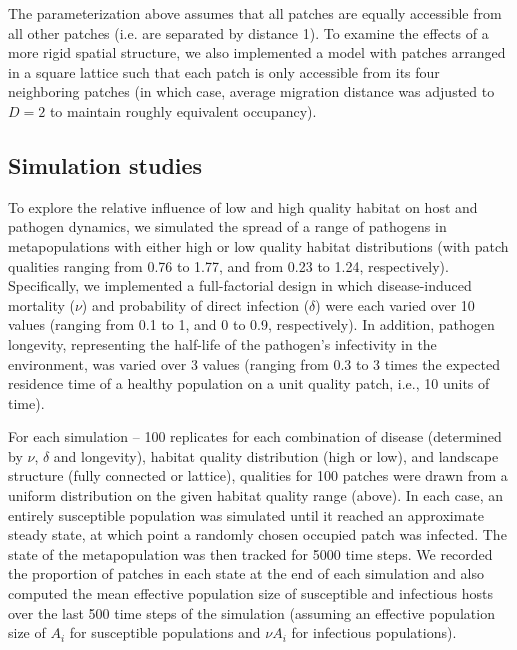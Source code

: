 \documentclass{article}
\begin{document}
The parameterization above assumes that all patches are equally accessible from all other patches (i.e. are separated by distance 1).  To examine the effects of a more rigid spatial structure, we also implemented a model with patches arranged in a square lattice such that each patch is only accessible from its four neighboring patches (in which case, average migration distance was adjusted to $D = 2$ to maintain roughly equivalent occupancy).  

\subsection{Simulation studies}

To explore the relative influence of low and high quality habitat on host and pathogen dynamics, we simulated the spread of a range of pathogens in metapopulations with either high or low quality habitat distributions (with patch qualities ranging from 0.76 to 1.77, and from 0.23 to 1.24, respectively).  Specifically, we implemented a full-factorial design in which disease-induced mortality ($\nu$) and probability of direct infection ($\delta$) were each varied over 10 values (ranging from 0.1 to 1, and 0 to 0.9, respectively).  In addition, pathogen longevity, representing the half-life of the pathogen's infectivity in the environment, was varied over 3 values (ranging from 0.3 to 3 times the expected residence time of a healthy population on a unit quality patch, i.e., 10 units of time).

For each simulation -- 100 replicates for each combination of disease (determined by $\nu$, $\delta$ and longevity), habitat quality distribution (high or low), and landscape structure (fully connected or lattice), qualities for 100 patches were drawn from a uniform distribution on the given habitat quality range (above). In each case, an entirely susceptible population was simulated until it reached an approximate steady state, at which point a randomly chosen occupied patch was infected.  The state of the metapopulation was then tracked for 5000 time steps.  We recorded the proportion of patches in each state at the end of each simulation and also computed the mean effective population size of susceptible and infectious hosts over the last 500 time steps of the simulation (assuming an effective population size of $A_i$ for susceptible populations and $\nu A_i$ for infectious populations).    
\end{document}
